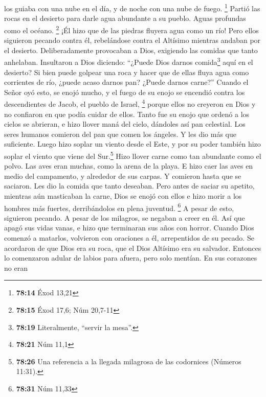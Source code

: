 los guiaba con una nube en el día, y de noche con una nube de fuego.
\footnote{\textbf{78:14} Éxod 13,21}  Partió las rocas en
el desierto para darle agua abundante a su pueblo. Aguas profundas como
el océano. \footnote{\textbf{78:15} Éxod 17,6; Núm 20,7-11}
 ¡Él hizo que de las piedras fluyera agua como un río!
 Pero ellos siguieron pecando contra él, rebelándose
contra el Altísimo mientras andaban por el desierto. 
Deliberadamente provocaban a Dios, exigiendo las comidas que tanto
anhelaban.  Insultaron a Dios diciendo: ``¿Puede Dios
darnos comida\footnote{\textbf{78:19} Literalmente, ``servir la mesa''.}
aquí en el desierto?  Si bien puede golpear una roca y
hacer que de ellas fluya agua como corrientes de río, ¿puede acaso
darnos pan? ¿Puede darnos carne?''  Cuando el Señor oyó
esto, se enojó mucho, y el fuego de su enojo se encendió contra los
descendientes de Jacob, el pueblo de Israel, \footnote{\textbf{78:21}
  Núm 11,1}  porque ellos no creyeron en Dios y no
confiaron en que podía cuidar de ellos.  Tanto fue su
enojo que ordenó a los cielos se abrieran,  e hizo llover
maná del cielo, dándoles así pan celestial.  Los seres
humanos comieron del pan que comen los ángeles. Y les dio más que
suficiente.  Luego hizo soplar un viento desde el Este, y
por su poder también hizo soplar el viento que viene del Sur.\footnote{\textbf{78:26}
  Una referencia a la llegada milagrosa de las codornices (Números
  11:31).}  Hizo llover carne como tan abundante como el
polvo. Las aves eran muchas, como la arena de la playa. 
E hizo caer las aves en medio del campamento, y alrededor de sus carpas.
 Y comieron hasta que se saciaron. Les dio la comida que
tanto deseaban.  Pero antes de saciar su apetito,
mientras aún masticaban la carne,  Dios se enojó con
ellos e hizo morir a los hombres más fuertes, derribándolos en plena
juventud. \footnote{\textbf{78:31} Núm 11,33}  A pesar de
esto, siguieron pecando. A pesar de los milagros, se negaban a creer en
él.  Así que apagó sus vidas vanas, e hizo que terminaran
sus años con horror.  Cuando Dios comenzó a matarlos,
volvieron con oraciones a él, arrepentidos de su pecado. 
Se acordaron de que Dios era su roca, que el Dios Altísimo era su
salvador.  Entonces lo comenzaron adular de labios para
afuera, pero solo mentían.  En sus corazones no eran
